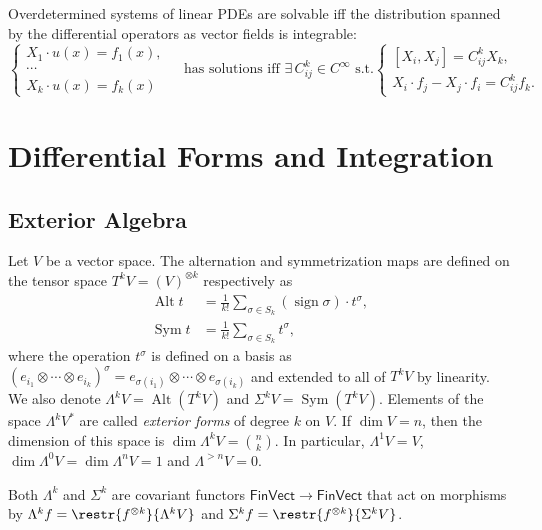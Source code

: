 \documentclass[english,letterpaper]{article}%
\numberwithin{equation}{section}
\numberwithin{figure}{section}
\numberwithin{table}{section}
\theoremstyle{definition}
\theoremstyle{definition}
\theoremstyle{definition}
\theoremstyle{plain}
\theoremstyle{plain}
\theoremstyle{plain}
\theoremstyle{plain}
\theoremstyle{remark}
\theoremstyle{remark}
\DeclareMathOperator{\sign}{sign}
\DeclareMathOperator{\Alt}{Alt}
\DeclareMathOperator{\Sym}{Sym}
\begin{document}
\begin{rem}
    Overdetermined systems of linear PDEs are solvable iff the distribution spanned by the differential operators as vector fields is integrable:
    \[\begin{cases}
        X_1\cdot u(x)=f_1(x),&\\
        \cdots &\\
        X_k\cdot u(x)=f_k(x)&
    \end{cases}
    \text{ has solutions iff }\exists\,C^k_{ij}\in C^\infty\text{ s.t.}
    \begin{cases}
        [X_i,X_j]=C^k_{ij}X_k,&\\
        X_i\cdot f_j-X_j\cdot f_i=C^k_{ij}f_k.&
    \end{cases}
    \]
\end{rem}



\section{Differential Forms and Integration}

\subsection{Exterior Algebra}


\begin{defn}
    Let $V$ be a vector space. The alternation and symmetrization maps are defined on the tensor space $T^k V=(V)^{\otimes k}$ respectively as
    \begin{align}
        \Alt t&=\frac{1}{k!}\sum_{\sigma\in S_k} (\sign\sigma)\cdot t^\sigma,\\
        \Sym t&=\frac{1}{k!}\sum_{\sigma\in S_k} t^\sigma,
    \end{align}
    where the operation $t^\sigma$ is defined on a basis as $(e_{i_1}\otimes\cdots\otimes e_{i_k})^\sigma=e_{\sigma(i_1)}\otimes\cdots\otimes e_{\sigma(i_k)}$ and extended to all of $T^k V$ by linearity. We also denote $\Lambda^k V=\Alt(T^k V)$ and $\Sigma^k V=\Sym(T^k V)$. Elements of the space $\Lambda^k V^\ast$ are called \emph{exterior forms} of degree $k$ on $V$. If $\dim V=n$, then the dimension of this space is $\dim \Lambda^k V=\binom{n}{k}$. In particular, $\Lambda^1 V=V$,  $\dim \Lambda^0 V=\dim \Lambda^n V=1$ and $\Lambda^{>n} V=0$.

    Both $\Lambda^k$ and $\Sigma^k$ are covariant functors $\mathsf{FinVect}\to\mathsf{FinVect}$ that act on morphisms by $\Lambda^k f=\restr{f^{\otimes k}}{\Lambda^k V}$ and $\Sigma^k f=\restr{f^{\otimes k}}{\Sigma^k V}$.
\end{defn}
\end{document}
